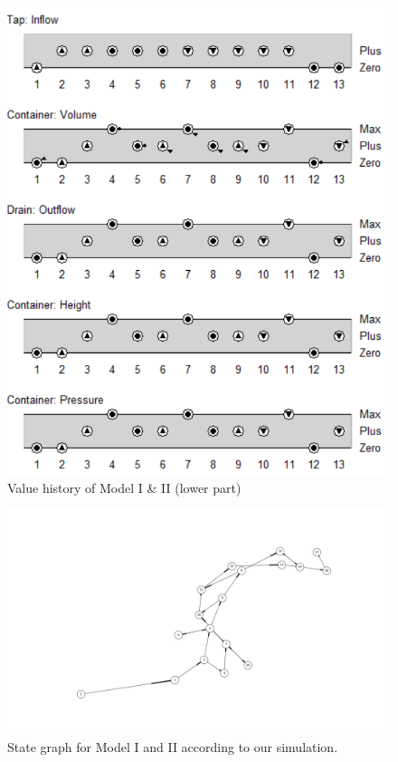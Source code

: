 \documentclass{article}
\begin{document}
\begin{figure}
	\includegraphics{Value_History_Extra}
	\caption{Value history of Model I \& II (lower part)}
	\label{figure9}
\end{figure}


\begin{figure}
	\includegraphics[scale=0.3]{Ok_State_Graph.png}
	\caption{State graph for Model I and II according to our simulation. }
	\label{figure8}
\end{figure}
\end{document}
